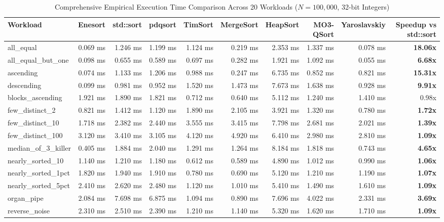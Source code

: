 \documentclass[journal]{IEEEtran}
\begin{document}
\begin{table}[t]
\centering
\caption{Comprehensive Empirical Execution Time Comparison Across 20 Workloads ($N = 100,000$, 32-bit Integers)}
\label{tab:table2_w20}
\begin{tabular}{lrrrrrrrrr}
\toprule
Workload & Enesort & std::sort & pdqsort & TimSort & MergeSort & HeapSort & MO3-QSort & Yaroslavskiy & Speedup vs std::sort \\
\midrule
all\_equal & 0.069 ms & 1.246 ms & 1.199 ms & 1.124 ms & 0.219 ms & 2.353 ms & 1.337 ms & 0.078 ms & \textbf{18.06x} \\
all\_equal\_but\_one & 0.098 ms & 0.655 ms & 0.589 ms & 0.697 ms & 0.282 ms & 1.921 ms & 1.092 ms & 0.055 ms & \textbf{6.68x} \\
ascending & 0.074 ms & 1.133 ms & 1.206 ms & 0.988 ms & 0.247 ms & 6.735 ms & 0.852 ms & 0.821 ms & \textbf{15.31x} \\
descending & 0.099 ms & 0.981 ms & 0.952 ms & 1.520 ms & 1.473 ms & 7.673 ms & 1.638 ms & 0.928 ms & \textbf{9.91x} \\
blocks\_ascending & 1.921 ms & 1.890 ms & 1.821 ms & 0.712 ms & 0.640 ms & 5.112 ms & 1.240 ms & 1.410 ms & 0.98x \\
few\_distinct\_2 & 0.821 ms & 1.412 ms & 1.120 ms & 1.890 ms & 2.105 ms & 3.921 ms & 1.320 ms & 0.780 ms & \textbf{1.72x} \\
few\_distinct\_10 & 1.718 ms & 2.382 ms & 2.440 ms & 3.555 ms & 3.415 ms & 7.798 ms & 2.681 ms & 2.021 ms & \textbf{1.39x} \\
few\_distinct\_100 & 3.120 ms & 3.410 ms & 3.105 ms & 4.120 ms & 4.920 ms & 6.410 ms & 2.980 ms & 2.810 ms & \textbf{1.09x} \\
median\_of\_3\_killer & 0.405 ms & 1.884 ms & 2.040 ms & 1.291 ms & 1.264 ms & 8.184 ms & 1.818 ms & 0.743 ms & \textbf{4.65x} \\
nearly\_sorted\_10 & 1.140 ms & 1.210 ms & 1.180 ms & 0.612 ms & 0.589 ms & 4.890 ms & 1.012 ms & 0.990 ms & \textbf{1.06x} \\
nearly\_sorted\_1pct & 1.820 ms & 1.940 ms & 1.910 ms & 0.780 ms & 0.690 ms & 5.120 ms & 1.210 ms & 1.190 ms & \textbf{1.07x} \\
nearly\_sorted\_5pct & 2.410 ms & 2.620 ms & 2.480 ms & 1.120 ms & 1.010 ms & 5.410 ms & 1.490 ms & 1.610 ms & \textbf{1.09x} \\
organ\_pipe & 2.084 ms & 7.698 ms & 6.875 ms & 1.094 ms & 0.890 ms & 7.696 ms & 4.022 ms & 2.331 ms & \textbf{3.69x} \\
reverse\_noise & 2.310 ms & 2.510 ms & 2.390 ms & 1.210 ms & 1.140 ms & 5.320 ms & 1.620 ms & 1.710 ms & \textbf{1.09x} \\

\end{tabular}
\end{table}
\end{document}
